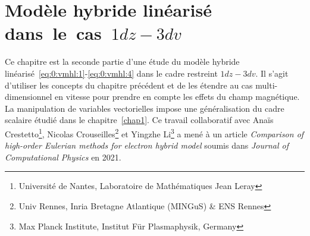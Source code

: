 \renewcommand{\localPath}{chap3}

\chapter{Modèle hybride linéarisé dans~le~cas~$1dz-3dv$}
\label{chap3}

Ce chapitre est la seconde partie d'une étude du modèle hybride linéarisé~\eqref{eq:0:vmhl:1}-\eqref{eq:0:vmhl:4} dans le cadre restreint $1dz-3dv$. Il s'agit d'utiliser les concepts du chapitre précédent et de les étendre au cas multi-dimensionnel en vitesse pour prendre en compte les effets du champ magnétique. La manipulation de variables vectorielles impose une généralisation du cadre scalaire étudié dans le chapitre~\ref{chap1}. Ce travail collaboratif avec Anaïs Crestetto\footnote{Université de Nantes, Laboratoire de Mathématiques Jean Leray}, Nicolas Crouseilles\footnote{Univ Rennes, Inria Bretagne Atlantique (MINGuS) \& ENS Rennes} et Yingzhe Li\footnote{Max Planck Institute, Institut Für Plasmaphysik, Germany} a mené à un article \emph{Comparison of high-order Eulerian methods for electron hybrid model} soumis dans \emph{Journal of Computational Physics} en 2021.

\renewcommand{\textfraction}{.1}
\renewcommand{\floatpagefraction}{.8}









